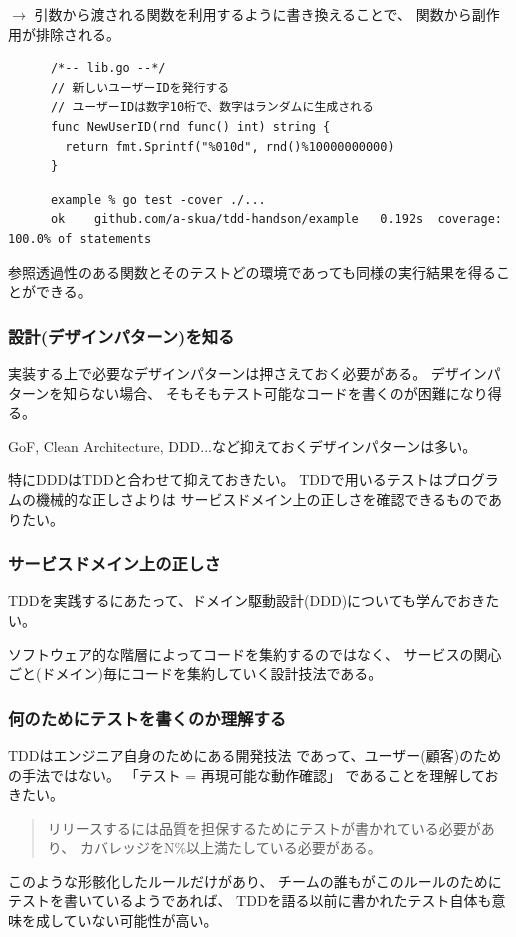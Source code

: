 \documentclass[aspectratio=169]{beamer}
\begin{document}
\begin{frame}[fragile]
  $\rightarrow$
  引数から渡される関数を利用するように書き換えることで、
  関数から副作用が排除される。
  {
    \scriptsize
    \begin{verbatim}
      /*-- lib.go --*/
      // 新しいユーザーIDを発行する
      // ユーザーIDは数字10桁で、数字はランダムに生成される
      func NewUserID(rnd func() int) string {
        return fmt.Sprintf("%010d", rnd()%10000000000)
      }
    \end{verbatim}
  }
  {
    \color{gray}
    \scriptsize
    \begin{verbatim}
      example % go test -cover ./...
      ok  	github.com/a-skua/tdd-handson/example	0.192s	coverage: 100.0% of statements
    \end{verbatim}
  }

  参照透過性のある関数とそのテストどの環境であっても同様の実行結果を得ることができる。
\end{frame}

\begin{frame}\frametitle{設計(デザインパターン)を知る}
  {\color{blue} 実装する上で必要なデザインパターンは押さえておく必要がある。}
  {
    \color{gray}
    デザインパターンを知らない場合、
    そもそもテスト可能なコードを書くのが困難になり得る。
  }

  GoF, Clean Architecture, DDD...など抑えておくデザインパターンは多い。

  {\color{blue} 特にDDDはTDDと合わせて抑えておきたい。}
  {
    \color{gray}
    TDDで用いるテストはプログラムの機械的な正しさよりは
    サービスドメイン上の正しさを確認できるものでありたい。
  }
\end{frame}

\begin{frame}\frametitle{サービスドメイン上の正しさ}
  TDDを実践するにあたって、ドメイン駆動設計(DDD)についても学んでおきたい。

  ソフトウェア的な階層によってコードを集約するのではなく、
  サービスの関心ごと(ドメイン)毎にコードを集約していく設計技法である。

\end{frame}

\begin{frame}\frametitle{何のためにテストを書くのか理解する}
  {\color{blue} TDDはエンジニア自身のためにある開発技法}
  であって、ユーザー(顧客)のための手法ではない。
  {\color{blue} 「テスト = 再現可能な動作確認」}
  であることを理解しておきたい。
  \begin{quote}
    \color{gray}
    リリースするには品質を担保するためにテストが書かれている必要があり、
    カバレッジをN\%以上満たしている必要がある。
  \end{quote}
  このような形骸化したルールだけがあり、
  チームの誰もがこのルールのためにテストを書いているようであれば、
  TDDを語る以前に書かれたテスト自体も意味を成していない可能性が高い。
\end{frame}
\end{document}
